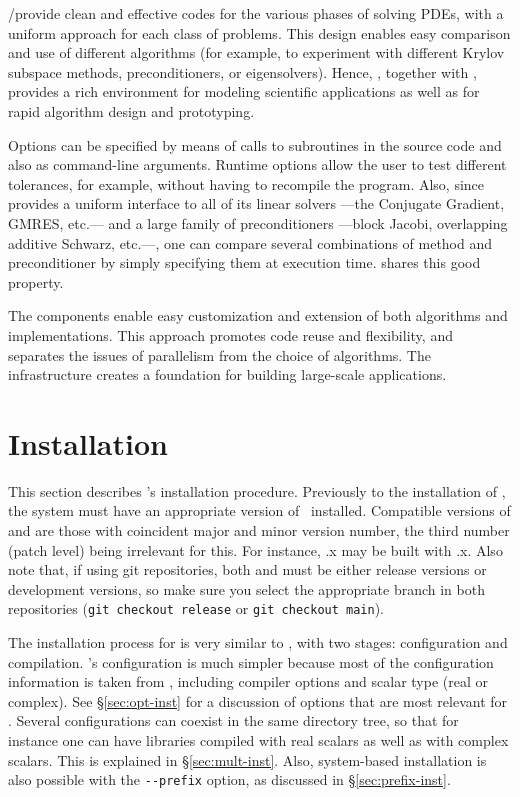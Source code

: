 	\petsc/\slepc provide clean and effective codes for the various phases of solving PDEs, with a uniform approach for each class of problems.  This design enables easy comparison and use of different algorithms (for example, to experiment with different Krylov subspace methods, preconditioners, or eigensolvers). Hence, \petsc, together with \slepc, provides a rich environment for modeling scientific applications as well as for rapid algorithm design and prototyping.

	Options can be specified by means of calls to subroutines in the source code and also as command-line arguments. Runtime options allow the user to test different tolerances, for example, without having to recompile the program. Also, since \petsc provides a uniform interface to all of its linear solvers ---the Conjugate Gradient, GMRES, etc.--- and a large family of preconditioners ---block Jacobi, overlapping additive Schwarz, etc.---, one can compare several combinations of method and preconditioner by simply specifying them at execution time. \slepc shares this good property.
	
	The components enable easy customization and extension of both algorithms and implementations. This approach promotes code reuse and flexibility, and separates the issues of parallelism from the choice of algorithms.  The \petsc infrastructure creates a foundation for building large-scale applications.

\section{Installation}
\label{sec:inst}

	This section describes \slepc's installation procedure.
	Previously to the installation of \slepc, the system must have an appropriate version of \petsc\ installed. Compatible versions of \petsc and \slepc are those with coincident major and minor version number, the third number (patch level) being irrelevant for this. For instance, .x may be built with .x. Also note that, if using git repositories, both \petsc and \slepc must be either release versions or development versions, so make sure you select the appropriate branch in both repositories (\texttt{git checkout release} or \texttt{git checkout main}).

	The installation process for \slepc is very similar to \petsc, with two stages: configuration and compilation. \slepc's configuration is much simpler because most of the configuration information is taken from \petsc, including compiler options and scalar type (real or complex). See \S\ref{sec:opt-inst} for a discussion of options that are most relevant for \slepc. Several configurations can coexist in the same directory tree, so that for instance one can have \slepc libraries compiled with real scalars as well as with complex scalars. This is explained in \S\ref{sec:mult-inst}. Also, system-based installation is also possible with the \Verb!--prefix! option, as discussed in \S\ref{sec:prefix-inst}.

